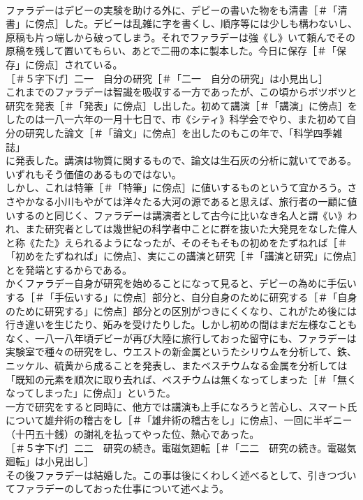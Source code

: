 \documentclass[8pt]{extreport}
\begin{document}
\begin{CJK}{UTF8}{min}
\\	ファラデーはデビーの実験を助ける外に、デビーの書いた物をも清書［＃「清書」に傍点］した。デビーは乱雑に字を書くし、順序等には少しも構わないし、原稿も片っ端しから破ってしまう。それでファラデーは強《し》いて頼んでその原稿を残して置いてもらい、あとで二冊の本に製本した。今日に保存［＃「保存」に傍点］されている。
\\	［＃５字下げ］二一　自分の研究［＃「二一　自分の研究」は小見出し］
\\	これまでのファラデーは智識を吸収する一方であったが、この頃からボツボツと研究を発表［＃「発表」に傍点］し出した。初めて講演［＃「講演」に傍点］をしたのは一八一六年の一月十七日で、市《シティ》科学会でやり、また初めて自分の研究した論文［＃「論文」に傍点］を出したのもこの年で、「科学四季雑誌」
\\	に発表した。講演は物質に関するもので、論文は生石灰の分析に就いてである。いずれもそう価値のあるものではない。
\\	しかし、これは特筆［＃「特筆」に傍点］に値いするものというて宜かろう。ささやかなる小川もやがては洋々たる大河の源であると思えば、旅行者の一顧に値いするのと同じく、ファラデーは講演者として古今に比いなき名人と謂《い》われ、また研究者としては幾世紀の科学者中ことに群を抜いた大発見をなした偉人と称《たた》えられるようになったが、そのそもそもの初めをたずねれば［＃「初めをたずねれば」に傍点］、実にこの講演と研究［＃「講演と研究」に傍点］とを発端とするからである。
\\	かくファラデー自身が研究を始めることになって見ると、デビーの為めに手伝いする［＃「手伝いする」に傍点］部分と、自分自身のために研究する［＃「自身のために研究する」に傍点］部分との区別がつきにくくなり、これがため後には行き違いを生じたり、妬みを受けたりした。しかし初めの間はまだ左様なこともなく、一八一八年頃デビーが再び大陸に旅行しておった留守にも、ファラデーは実験室で種々の研究をし、ウエストの新金属というたシリウムを分析して、鉄、ニッケル、硫黄から成ることを発表し、またベスチウムなる金属を分析しては「既知の元素を順次に取り去れば、ベスチウムは無くなってしまった［＃「無くなってしまった」に傍点］」というた。
\\	一方で研究をすると同時に、他方では講演も上手になろうと苦心し、スマート氏について雄弁術の稽古をし［＃「雄弁術の稽古をし」に傍点］、一回に半ギニー（十円五十銭）の謝礼を払ってやった位、熱心であった。
\\	［＃５字下げ］二二　研究の続き。電磁気廻転［＃「二二　研究の続き。電磁気廻転」は小見出し］
\\	その後ファラデーは結婚した。この事は後にくわしく述べるとして、引きつづいてファラデーのしておった仕事について述べよう。

\end{CJK}
\end{document}

